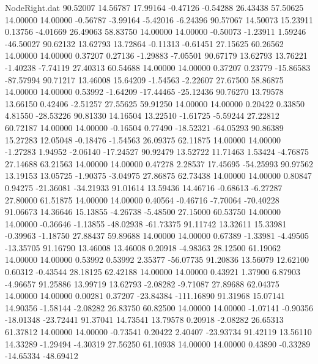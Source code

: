 \begin{filecontents}{NodeRight.dat}
  90.52007   14.56787   17.99164    -0.47126   -0.54288   26.43438   57.50625   14.00000   14.00000   -0.56787   -3.99164   -5.42016   -6.24396
  90.57067   14.50073   15.23911     0.13756   -4.01669   26.49063   58.83750   14.00000   14.00000   -0.50073   -1.23911    1.59246  -46.50027
  90.62132   13.62793   13.72864    -0.11313   -0.61451   27.15625   60.26562   14.00000   14.00000    0.37207    0.27136   -1.29883   -7.05501
  90.67179   13.62793   13.76221    -1.40238   -7.74119   27.40313   60.54688   14.00000   14.00000    0.37207    0.23779  -15.86583  -87.57994
  90.71217   13.46008   15.64209    -1.54563   -2.22607   27.67500   58.86875   14.00000   14.00000    0.53992   -1.64209  -17.44465  -25.12436
  90.76270   13.79578   13.66150     0.42406   -2.51257   27.55625   59.91250   14.00000   14.00000    0.20422    0.33850    4.81550  -28.53226
  90.81330   14.16504   13.22510    -1.61725   -5.59244   27.22812   60.72187   14.00000   14.00000   -0.16504    0.77490  -18.52321  -64.05293
  90.86389   15.27283   12.05048    -0.18476   -1.54563   26.09375   62.11875   14.00000   14.00000   -1.27283    1.94952   -2.06140  -17.24527
  90.92479   13.52722   11.71463     1.53424   -4.76875   27.14688   63.21563   14.00000   14.00000    0.47278    2.28537   17.45695  -54.25993
  90.97562   13.19153   13.05725    -1.90375   -3.04975   27.86875   62.73438   14.00000   14.00000    0.80847    0.94275  -21.36081  -34.21933
  91.01614   13.59436   14.46716    -0.68613   -6.27287   27.80000   61.51875   14.00000   14.00000    0.40564   -0.46716   -7.70064  -70.40228
  91.06673   14.36646   15.13855    -4.26738   -5.48500   27.15000   60.53750   14.00000   14.00000   -0.36646   -1.13855  -48.02938  -61.73375
  91.11742   13.32611   15.33981    -0.39963   -1.18750   27.88437   59.89688   14.00000   14.00000    0.67389   -1.33981   -4.49505  -13.35705
  91.16790   13.46008   13.46008     0.20918   -4.98363   28.12500   61.19062   14.00000   14.00000    0.53992    0.53992    2.35377  -56.07735
  91.20836   13.56079   12.62100     0.60312   -0.43544   28.18125   62.42188   14.00000   14.00000    0.43921    1.37900    6.87903   -4.96657
  91.25886   13.99719   13.62793    -2.08282   -9.71087   27.89688   62.04375   14.00000   14.00000    0.00281    0.37207  -23.84384 -111.16890
  91.31968   15.07141   14.90356    -1.58144   -2.08282   26.83750   60.82500   14.00000   14.00000   -1.07141   -0.90356  -18.01348  -23.72441
  91.37041   14.73541   13.79578     0.20918   -2.08282   26.65313   61.37812   14.00000   14.00000   -0.73541    0.20422    2.40407  -23.93734
  91.42119   13.56110   14.33289    -1.29494   -4.30319   27.56250   61.10938   14.00000   14.00000    0.43890   -0.33289  -14.65334  -48.69412

\end{filecontents}
